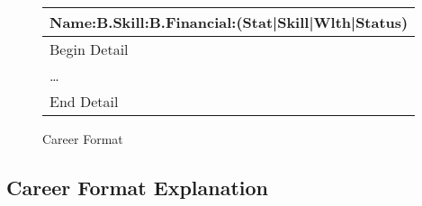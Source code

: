 
\begin{figure}[htb]
\caption{Career Format}
	\begin{tabular}{|l|} \hline
	Name:B.Skill:B.Financial:(Stat|Skill|Wlth|Status)\\  \hline
	Begin Detail \\
	\dots \\
	End Detail \\ \hline
    \end{tabular}
\end{figure}

\subsection{Career Format Explanation}
